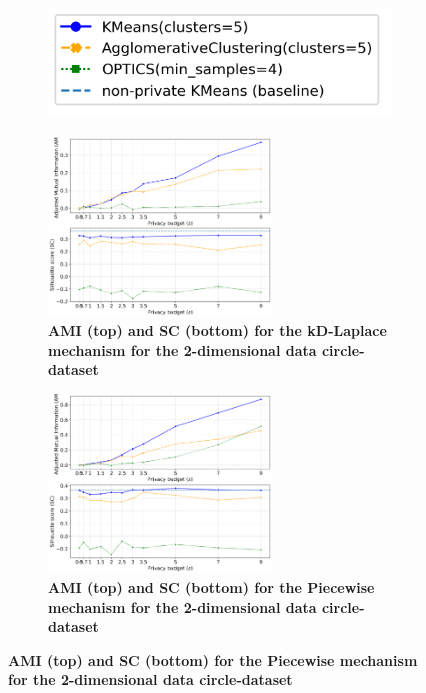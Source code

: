 \begin{figure}[H]
      \centering
      \begin{subfigure}{0.3\textwidth}
            \includegraphics[width=\textwidth]{Results/kd-laplace/kd-Laplace/circle-dataset/legend_2.png}
      \end{subfigure}
      \begin{subfigure}{1\textwidth}
            \centering
            \caption{\textbf{AMI (top) and SC (bottom) for the kD-Laplace mechanism for the 2-dimensional data circle-dataset}}
            \includegraphics[width=0.65\textwidth]{Results/kd-laplace/kd-Laplace/circle-dataset/ami-and-sc_2_dimensions.png}
            \centering
      \end{subfigure}
      \begin{subfigure}{1\textwidth}
            \centering
            \caption{\textbf{AMI (top) and SC (bottom) for the Piecewise mechanism for the 2-dimensional data circle-dataset}}
            \includegraphics[width=0.65\textwidth]{Results/kd-laplace/piecewise/circle-dataset/ami-and-sc_2_dimensions.png}
      \end{subfigure}
      \label{fig:validation-circle-dataset_comparison_2d-laplace}
\end{figure}
